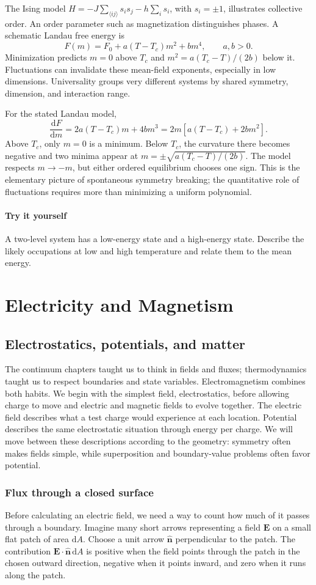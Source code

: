 \documentclass[11pt,oneside]{book}
\newcommand{\dd}{\mathrm{d}}
\newcommand{\vect}[1]{\boldsymbol{#1}}
\newcommand{\od}[2]{\frac{\dd #1}{\dd #2}}
\theoremstyle{reviewstyle}
\newcommand{\learningcheck}[1]{\subsection*{Try it yourself}\noindent #1\par}
\begin{document}
The Ising model $H=-J\sum_{\langle ij\rangle}s_is_j-h\sum_i s_i$, with $s_i=\pm1$, illustrates collective order. An order parameter such as magnetization distinguishes phases. A schematic Landau free energy is
\begin{equation}F(m)=F_0+a(T-T_c)m^2+bm^4,\qquad a,b>0.\end{equation}
Minimization predicts $m=0$ above $T_c$ and $m^2=a(T_c-T)/(2b)$ below it. Fluctuations can invalidate these mean-field exponents, especially in low dimensions. Universality groups very different systems by shared symmetry, dimension, and interaction range.

For the stated Landau model,
\begin{equation}
\od Fm=2a(T-T_c)m+4bm^3
=2m[a(T-T_c)+2bm^2].
\end{equation}
Above $T_c$, only $m=0$ is a minimum. Below $T_c$, the curvature there becomes negative and two minima appear at $m=\pm\sqrt{a(T_c-T)/(2b)}$. The model respects $m\to-m$, but either ordered equilibrium chooses one sign. This is the elementary picture of spontaneous symmetry breaking; the quantitative role of fluctuations requires more than minimizing a uniform polynomial.

\learningcheck{A two-level system has a low-energy state and a high-energy state. Describe the likely occupations at low and high temperature and relate them to the mean energy.}

\part{Electricity and Magnetism}
\chapter{Electrostatics, potentials, and matter}
The continuum chapters taught us to think in fields and fluxes; thermodynamics taught us to respect boundaries and state variables. Electromagnetism combines both habits. We begin with the simplest field, electrostatics, before allowing charge to move and electric and magnetic fields to evolve together.
The electric field describes what a test charge would experience at each location. Potential describes the same electrostatic situation through energy per charge. We will move between these descriptions according to the geometry: symmetry often makes fields simple, while superposition and boundary-value problems often favor potential.

\section{Flux through a closed surface}
Before calculating an electric field, we need a way to count how much of it passes through a boundary. Imagine many short arrows representing a field $\vect E$ on a small flat patch of area $\dd A$. Choose a unit arrow $\hat{\vect n}$ perpendicular to the patch. The contribution $\vect E\cdot\hat{\vect n}\,\dd A$ is positive when the field points through the patch in the chosen outward direction, negative when it points inward, and zero when it runs along the patch.
\end{document}
